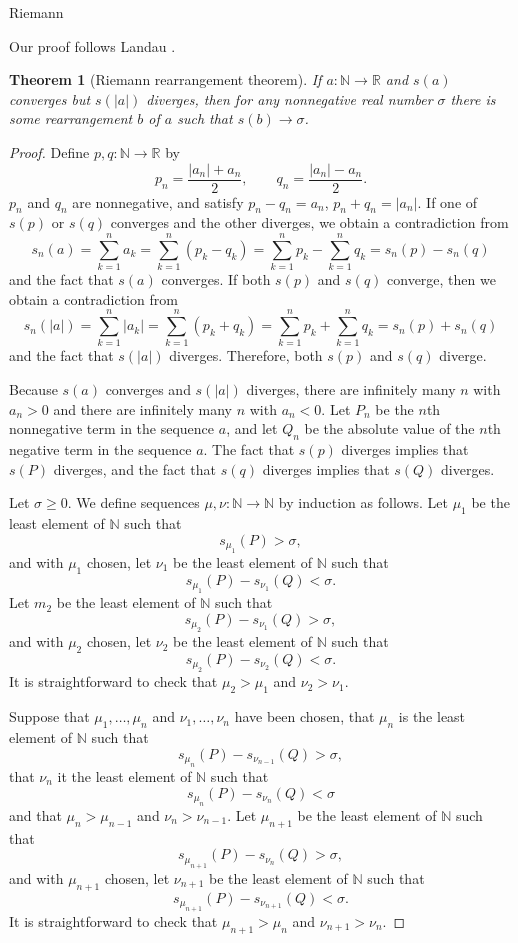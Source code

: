 \documentclass{article}
\newtheorem{theorem}{Theorem}
\begin{document}
Riemann \cite[pp.~96-97]{riemann}

Our proof follows Landau \cite[p.~158, Theorem 217]{landau}.



\begin{theorem}[Riemann rearrangement theorem]
If $a:\mathbb{N} \to \mathbb{R}$ and $s(a)$ converges but $s(|a|)$ diverges, then
 for any nonnegative real number $\sigma$ there is some rearrangement $b$ of $a$ such that $s(b) \to \sigma$.
\end{theorem}
\begin{proof}
Define $p,q:\mathbb{N} \to \mathbb{R}$ by
\[
p_n = \frac{|a_n|+a_n}{2}, \qquad q_n = \frac{|a_n|-a_n}{2}.
\]
$p_n$ and $q_n$ are nonnegative, and satisfy $p_n-q_n = a_n$, $p_n+q_n=|a_n|$. 
If one of $s(p)$ or $s(q)$ converges and the other diverges, we obtain a contradiction from
\[
s_n(a)=\sum_{k=1}^n a_k = \sum_{k=1}^n (p_k-q_k) = \sum_{k=1}^n p_k - \sum_{k=1}^n q_k=s_n(p)-s_n(q)
\]
and the fact that $s(a)$ converges.
If both $s(p)$ and $s(q)$ converge, then we obtain a contradiction from
\[
s_n(|a|)=\sum_{k=1}^n |a_k| = \sum_{k=1}^n (p_k+q_k) = \sum_{k=1}^n p_k + \sum_{k=1}^n q_k = s_n(p)+s_n(q)
\] 
and the fact that $s(|a|)$ diverges. Therefore, both $s(p)$ and $s(q)$ diverge.

Because $s(a)$ converges and $s(|a|)$ diverges, there are infinitely many $n$ with $a_n>0$ and there are infinitely many $n$ with
$a_n<0$. Let $P_n$ be the $n$th nonnegative term in the sequence $a$, and let $Q_n$ be the absolute value of the $n$th negative term
in the sequence $a$. 
The fact that $s(p)$ diverges  implies that  $s(P)$ diverges, and the fact that $s(q)$ diverges implies that $s(Q)$ diverges.

Let $\sigma\geq 0$. We define sequences $\mu,\nu:\mathbb{N} \to \mathbb{N}$ by induction
as follows.
Let $\mu_1$ be  the least element of $\mathbb{N}$ such that
\[
s_{\mu_1}(P) >\sigma,
\]
and with $\mu_1$ chosen, let $\nu_1$ be the least element of $\mathbb{N}$ such that 
\[
s_{\mu_1}(P)-s_{\nu_1}(Q)<\sigma.
\]
Let $m_2$ be the least element of $\mathbb{N}$ such that
\[
s_{\mu_2}(P)-s_{\nu_1}(Q)>\sigma,
\]
and with $\mu_2$ chosen, let $\nu_2$ be the least element of $\mathbb{N}$ such that
\[
s_{\mu_2}(P)-s_{\nu_2}(Q)<\sigma.
\]
It is straightforward to check that $\mu_2>\mu_1$ and $\nu_2>\nu_1$.

Suppose that $\mu_1,\ldots,\mu_n$ and $\nu_1,\ldots,\nu_n$ have been chosen,
that $\mu_n$ is the least element of $\mathbb{N}$ such that
\[
s_{\mu_n}(P)-s_{\nu_{n-1}}(Q)>\sigma,
\]
that $\nu_n$ it the least element of $\mathbb{N}$ such that
\[
s_{\mu_n}(P)-s_{\nu_n}(Q)<\sigma
\]
and that
$\mu_n>\mu_{n-1}$ and $\nu_n>\nu_{n-1}$. 
Let $\mu_{n+1}$ be the least element of $\mathbb{N}$ such that
\[
s_{\mu_{n+1}}(P)-s_{\nu_n}(Q)>\sigma,
\]
and with $\mu_{n+1}$ chosen, let $\nu_{n+1}$ be the least element of $\mathbb{N}$ such that
\[
s_{\mu_{n+1}}(P)-s_{\nu_{n+1}}(Q)<\sigma.
\]
It is straightforward to check that $\mu_{n+1} > \mu_n$ and
$\nu_{n+1}>\nu_n$.


\end{proof}
\end{document}
